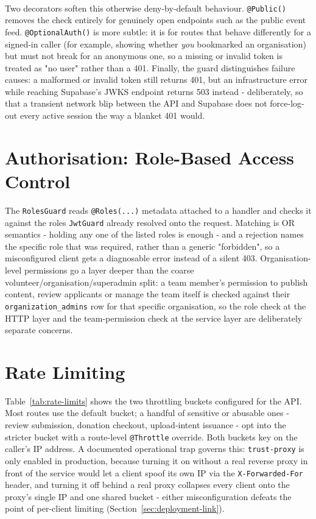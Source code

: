 \noindent \\Two decorators soften this otherwise deny-by-default behaviour. \texttt{@Public()} removes the check entirely for genuinely open endpoints such as the public event feed. \texttt{@OptionalAuth()} is more subtle: it is for routes that behave differently for a signed-in caller (for example, showing whether \emph{you} bookmarked an organisation) but must not break for an anonymous one, so a missing or invalid token is treated as "no user" rather than a 401. Finally, the guard distinguishes failure causes: a malformed or invalid token still returns 401, but an infrastructure error while reaching Supabase's JWKS endpoint returns 503 instead - deliberately, so that a transient network blip between the API and Supabase does not force-log-out every active session the way a blanket 401 would.

\section{Authorisation: Role-Based Access Control}
\label{sec:rbac-internals}
The \texttt{RolesGuard} reads \texttt{@Roles(...)} metadata attached to a handler and checks it against the roles \texttt{JwtGuard} already resolved onto the request. Matching is OR semantics - holding any one of the listed roles is enough - and a rejection names the specific role that was required, rather than a generic "forbidden", so a misconfigured client gets a diagnosable error instead of a silent 403. Organisation-level permissions go a layer deeper than the coarse volunteer/organisation/superadmin split: a team member's permission to publish content, review applicants or manage the team itself is checked against their \texttt{organization\_admins} row for that specific organisation, so the role check at the HTTP layer and the team-permission check at the service layer are deliberately separate concerns.

\section{Rate Limiting}
\label{sec:rate-limiting}
Table~\ref{tab:rate-limits} shows the two throttling buckets configured for the API. Most routes use the default bucket; a handful of sensitive or abusable ones - review submission, donation checkout, upload-intent issuance - opt into the stricter bucket with a route-level \texttt{@Throttle} override.
\clearpage \noindent Both buckets key on the caller's IP address. A documented operational trap governs this: \texttt{trust-proxy} is only enabled in production, because turning it on without a real reverse proxy in front of the service would let a client spoof its own IP via the \texttt{X-Forwarded-For} header, and turning it off behind a real proxy collapses every client onto the proxy's single IP and one shared bucket - either misconfiguration defeats the point of per-client limiting (Section~\ref{sec:deployment-link}).

